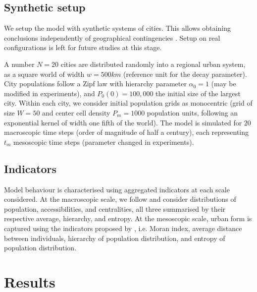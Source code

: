 \documentclass[referee,lineno,pdflatex,sn-apa]{sn-jnl}
\begin{document}


\subsection{Synthetic setup}

We setup the model with synthetic systems of cities. This allows obtaining conclusions independently of geographical contingencies \cite{raimbault2019space}. Setup on real configurations is left for future studies at this stage.

A number $N=20$ cities are distributed randomly into a regional urban system, as a square world of width $w=500km$ (reference unit for the decay parameter). City populations follow a Zipf law with hierarchy parameter $\alpha_0 = 1$ (may be modified in experiments), and $P_0 (0) = 100,000$ the initial size of the largest city. Within each city, we consider initial population grids as monocentric (grid of size $W=50$ and center cell density $P_m = 1000$ population units, following an exponential kernel of width one fifth of the world). The model is simulated for 20 macroscopic time steps (order of magnitude of half a century), each representing $t_m$ mesoscopic time steps (parameter changed in experiments).







\subsection{Indicators}

Model behaviour is characterised using aggregated indicators at each scale considered. At the  macroscopic scale, we follow \cite{raimbault2020unveiling} and consider distributions of population, accessibilities, and centralities, all three summarised by their respective average, hierarchy, and entropy. At the mesoscopic scale, urban form is captured using the indicators proposed by \cite{raimbault2018calibration}, i.e. Moran index, average distance between individuals, hierarchy of population distribution, and entropy of population distribution.


\section{Results}
\end{document}
